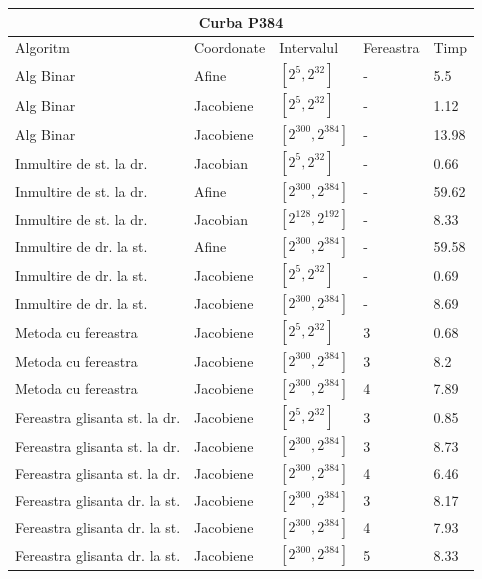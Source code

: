 \begin{tabular}{ |p{5cm}||p{3cm}|p{3cm}|p{2cm}|p{1cm}|  }
 \hline
 \multicolumn{5}{|c|}{Curba P384} \\
 \hline
 Algoritm& Coordonate &Intervalul &Fereastra &Timp\\
 \hline
 Alg Binar & Afine  &$[2^{5},2^{32}]$& - & 5.5\\
 Alg Binar&Jacobiene  & $[2^{5},2^{32}]$ & - & 1.12\\
 Alg Binar&Jacobiene  & $[2^{300},2^{384}]$ & - & 13.98\\
 Inmultire de st. la dr. & Jacobian & $[2^{5},2^{32}]$& - & 0.66\\
 Inmultire de st. la dr. & Afine & $[2^{300},2^{384}]$& - & 59.62\\
 Inmultire de st. la dr. & Jacobian & $[2^{128},2^{192}]$& - & 8.33\\
 Inmultire de dr. la st. &Afine & $[2^{300},2^{384}]$ & - & 59.58\\
 Inmultire de dr. la st. &Jacobiene & $[2^{5},2^{32}]$ & - & 0.69\\
 Inmultire de dr. la st. &Jacobiene & $[2^{300},2^{384}]$ & - & 8.69\\
 Metoda cu fereastra& Jacobiene & $[2^{5},2^{32}]$ & 3 & 0.68\\
 Metoda cu fereastra& Jacobiene & $[2^{300},2^{384}]$ & 3 & 8.2\\
 Metoda cu fereastra& Jacobiene & $[2^{300},2^{384}]$ & 4 & 7.89\\
 Fereastra glisanta st. la dr.& Jacobiene  & $[2^{5},2^{32}]$& 3 & 0.85\\
 Fereastra glisanta st. la dr.& Jacobiene  & $[2^{300},2^{384}]$& 3 & 8.73\\
  Fereastra glisanta st. la dr.& Jacobiene  & $[2^{300},2^{384}]$& 4 & 6.46\\
 Fereastra glisanta dr. la st.& Jacobiene  & $[2^{300},2^{384}]$& 3 & 8.17\\
 Fereastra glisanta dr. la st.& Jacobiene  & $[2^{300},2^{384}]$& 4 & 7.93\\
 Fereastra glisanta dr. la st.& Jacobiene  & $[2^{300},2^{384}]$& 5 & 8.33\\
 \hline
\end{tabular}	

